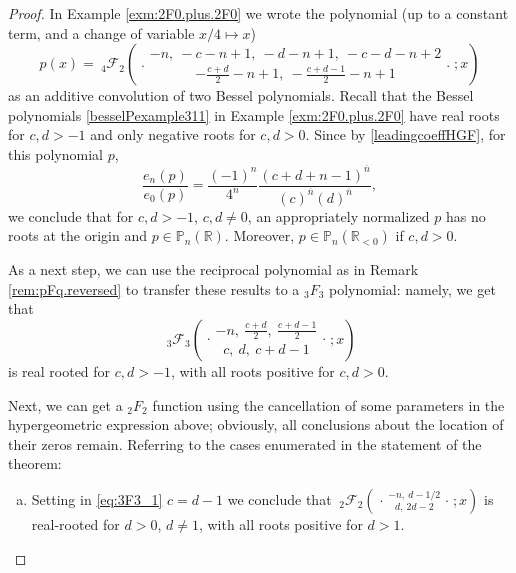 \documentclass[reqno,11pt]{amsart}
\theoremstyle{remark}
\renewcommand{\P}{\mathbb{P}}
\newcommand{\rr}{\mathbb{R}}
\newcommand{\raising}[2]{\left(#1\right)^{\overline{#2}}}
\newcommand*\pFq[5]{%
 {\ }_{#1}{\mathcal F}_{#2}{\left(\genfrac..{0pt}{}{#3}{#4};#5\right)}%
}
\begin{document}
\begin{proof}
In Example \ref{exm:2F0.plus.2F0} we wrote the polynomial (up to a constant term, and a change of variable $x/4\mapsto x$) 
$$
p(x)=\pFq{4}{2}{-n,\ -c-n+1,\ -d-n+1,\ -c-d-n+2}{-\frac{c+d}{2}-n+1,\ -\frac{c+d-1}{2}-n+1}{x}
$$
as an additive convolution of two Bessel polynomials. 
Recall that the Bessel polynomials \eqref{besselPexample311} in Example \ref{exm:2F0.plus.2F0} 
have real roots for $c,d>-1$ and only negative roots for $c,d>0$. Since by \eqref{leadingcoeffHGF}, for this polynomial $p$,
$$
\frac{e_n(p)}{e_0(p)} = \frac{(-1)^n}{4^n} \frac{\raising{c+d+n-1}{n}}{\raising{c}{n} \raising{d}{n}},
$$
we conclude that  for $c,d>-1$, $c, d \neq 0$, an appropriately normalized $p$ has no roots at the origin and $p\in \P_n(\rr)$. Moreover,  $p\in \P_n(\rr_{<0})$ if $c,d>0$.

As a next step, we can use the reciprocal polynomial as in Remark \ref{rem:pFq.reversed} to transfer these results to a $_3 F_3$ polynomial: namely, we get that 
\begin{equation}
    \label{eq:3F3_1}
    \pFq{3}{3}{-n,\ \frac{c+d}{2}, \ \frac{c+d-1}{2}}{c,\ d,\ c+d-1}{x}
\end{equation}
is real rooted for $c,d>-1$, with all roots positive  for $c,d>0$.

Next, we can get a ${}_2 F_2$ function using the cancellation of some parameters in the hypergeometric expression above; obviously, all conclusions about the location of their zeros remain. Referring to the cases enumerated in the statement of the theorem:
\begin{enumerate}[(a)]
    \item Setting in \eqref{eq:3F3_1} $c=d-1$  we conclude that  $
    \pFq{2}{2}{-n,\ d- 1/2}{d,\ 2d-2}{x}
    $
    is real-rooted for $d>0$, $d\neq 1$, with all roots positive for $d>1$.


\end{enumerate}
\end{proof}
\end{document}
